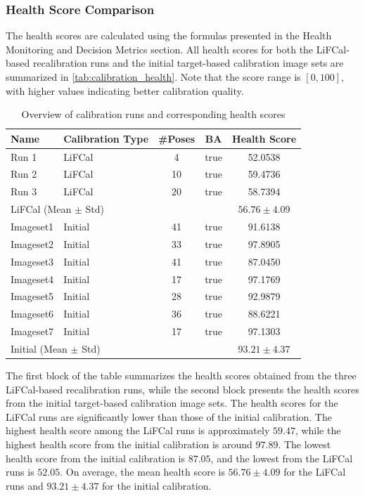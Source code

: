 \documentclass[12pt]{scrartcl}
\begin{document}
\subsubsection{Health Score Comparison}

The health scores are calculated using the formulas presented in the Health Monitoring and Decision Metrics section. All health scores for both the LiFCal-based recalibration runs and the initial target-based calibration image sets are summarized in \autoref{tab:calibration_health}. Note that the score range is $[0,100]$, with higher values indicating better calibration quality.

\begin{table}[htbp]
\centering
\small
\begin{tabular}{l l c c c}
\toprule
Name & Calibration Type & \#Poses & BA & Health Score \\
\midrule
Run 1 & LiFCal & 4  & true & 52.0538 \\
Run 2 & LiFCal & 10 & true & 59.4736 \\
Run 3 & LiFCal & 20 & true & 58.7394 \\
\midrule
\multicolumn{4}{l}{LiFCal (Mean $\pm$ Std)} & $56.76 \pm 4.09$ \\
\midrule
Imageset1 & Initial & 41 & true & 91.6138 \\
Imageset2 & Initial & 33 & true & 97.8905 \\
Imageset3 & Initial & 41 & true & 87.0450 \\
Imageset4 & Initial & 17 & true & 97.1769 \\
Imageset5 & Initial & 28 & true & 92.9879 \\
Imageset6 & Initial & 36 & true & 88.6221 \\
Imageset7 & Initial & 17 & true & 97.1303 \\
\midrule
\multicolumn{4}{l}{Initial (Mean $\pm$ Std)} & $93.21 \pm 4.37$ \\
\bottomrule
\end{tabular}
\caption{Overview of calibration runs and corresponding health scores}
\label{tab:calibration_health}
\end{table}

The first block of the table summarizes the health scores obtained from the three LiFCal-based recalibration runs, while the second block presents the health scores from the initial target-based calibration image sets. The health scores for the LiFCal runs are significantly lower than those of the initial calibration. The highest health score among the LiFCal runs is approximately $59.47$, while the highest health score from the initial calibration is around $97.89$. The lowest health score from the initial calibration is $87.05$, and the lowest from the LiFCal runs is $52.05$. On average, the mean health score is $56.76 \pm 4.09$ for the LiFCal runs and $93.21 \pm 4.37$ for the initial calibration.
\end{document}
